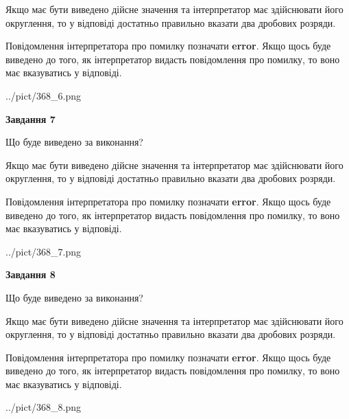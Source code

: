 \documentclass[12pt, ukrainian]{article}
\begin{document}
{\begin {Large}
Якщо має бути виведено дійсне значення та інтерпретатор має здійснювати його округлення, 
то у відповіді достатньо правильно вказати два дробових розряди.

Повідомлення інтерпретатора про помилку позначати \textbf{error}.
Якщо щось буде виведено до того, як інтерпретатор видасть повідомлення про помилку, 
то воно має вказуватись у відповіді. \par

\begin{center}
	{../pict/368_6.png}
\end{center}
\newpage

{\begin {center}\textbf{Завдання 7}\end {center}}\par
Що буде виведено за виконання? \par

Якщо має бути виведено дійсне значення та інтерпретатор має здійснювати його округлення, 
то у відповіді достатньо правильно вказати два дробових розряди.

Повідомлення інтерпретатора про помилку позначати \textbf{error}.
Якщо щось буде виведено до того, як інтерпретатор видасть повідомлення про помилку, 
то воно має вказуватись у відповіді. \par

\begin{center}
	{../pict/368_7.png}
\end{center}
\newpage

{\begin {center}\textbf{Завдання 8}\end {center}}\par
Що буде виведено за виконання? \par

Якщо має бути виведено дійсне значення та інтерпретатор має здійснювати його округлення, 
то у відповіді достатньо правильно вказати два дробових розряди.

Повідомлення інтерпретатора про помилку позначати \textbf{error}.
Якщо щось буде виведено до того, як інтерпретатор видасть повідомлення про помилку, 
то воно має вказуватись у відповіді. \par

\begin{center}
	{../pict/368_8.png}
\end{center}
\newpage


\end{Large}}
\end{document}
